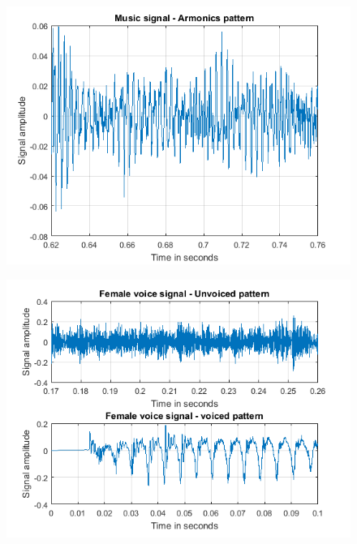 \begin{figure}[h]
\centering
\begin{minipage}{.5\textwidth}
  \centering
  \includegraphics[width=0.95\linewidth]{./images/music_time_zoom.png}
  \label{fig:2}	
\end{minipage}%
\begin{minipage}{.5\textwidth}
  \centering
  \includegraphics[width=0.95\linewidth]{./images/female_time_zoom.png}
   \label{fig:3}	
\end{minipage}

 
\end{figure}
